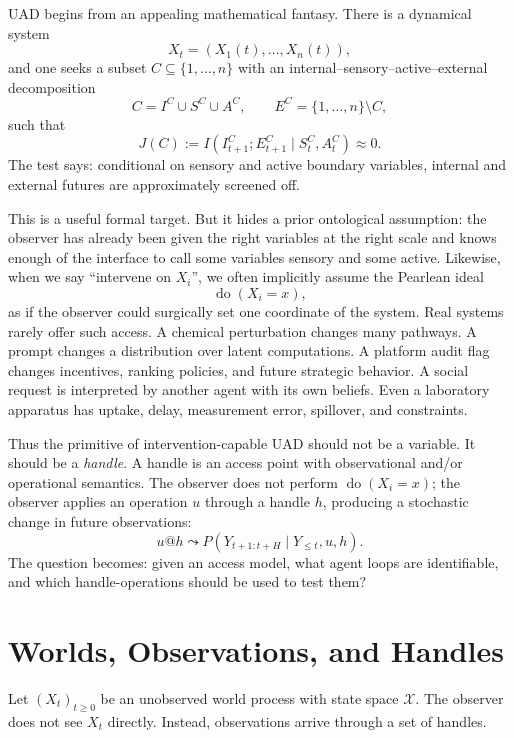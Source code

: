 \documentclass[11pt]{article}
\newcommand{\X}{\mathcal X}
\newcommand{\MI}{I}
\newcommand{\doop}{\operatorname{do}}
\begin{document}
UAD begins from an appealing mathematical fantasy. There is a dynamical system
\[
    X_t=(X_1(t),\ldots,X_n(t)),
\]
and one seeks a subset $C\subseteq\{1,\ldots,n\}$ with an internal--sensory--active--external
decomposition
\[
    C = I^C\cup S^C\cup A^C,\qquad E^C = \{1,\ldots,n\}\setminus C,
\]
such that
\begin{equation}
    J(C) :=
    \MI\!\left(I^C_{t+1};E^C_{t+1}\mid S^C_t,A^C_t\right)
    \approx 0 .
    \label{eq:uad-blanket}
\end{equation}
The test says: conditional on sensory and active boundary variables, internal
and external futures are approximately screened off.

This is a useful formal target. But it hides a prior ontological assumption:
the observer has already been given the right variables at the right scale and
knows enough of the interface to call some variables sensory and some active.
Likewise, when we say ``intervene on $X_i$'', we often implicitly assume the
Pearlean ideal~\cite{pearl2009causality}
\[
    \doop(X_i=x),
\]
as if the observer could surgically set one coordinate of the system. Real
systems rarely offer such access. A chemical perturbation changes many pathways.
A prompt changes a distribution over latent computations. A platform audit flag
changes incentives, ranking policies, and future strategic behavior. A social
request is interpreted by another agent with its own beliefs. Even a laboratory
apparatus has uptake, delay, measurement error, spillover, and constraints.

Thus the primitive of intervention-capable UAD should not be a variable. It
should be a \emph{handle}. A handle is an access point with observational and/or
operational semantics. The observer does not perform $\doop(X_i=x)$; the
observer applies an operation $u$ through a handle $h$, producing a stochastic
change in future observations:
\[
    u@h \leadsto P(Y_{t+1:t+H}\mid Y_{\le t},u,h).
\]
The question becomes: given an access model, what agent loops are identifiable,
and which handle-operations should be used to test them?

\section{Worlds, Observations, and Handles}

Let $(X_t)_{t\ge0}$ be an unobserved world process with state space $\X$. The
observer does not see $X_t$ directly. Instead, observations arrive through a set
of handles.
\end{document}
